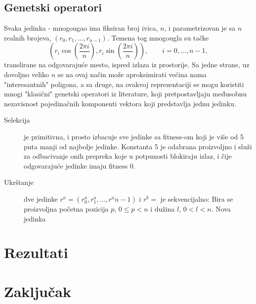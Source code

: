 \documentclass[12pt]{article}
\begin{document}
\subsection*{Genetski operatori}

Svaka jedinka - mnogougao ima fiksiran broj ivica, $n$, i parametrizovan je sa $n$ realnih brojeva, $(r_0, r_1, \dots, r_{n-1})$. Temena tog mnogougla su tačke
$$\left(r_i \cos\left(\frac{2\pi i}{n}\right), r_i \sin\left(\frac{2\pi i}{n}\right)\right), \qquad i=0,\dots,n-1,$$
translirane na odgovarajuće mesto, ispred izlaza iz prostorije. Sa jedne strane, uz dovoljno veliko $n$ se na ovaj način može aproksimirati većina nama "interesantnih" poligona, a sa druge, na ovakvoj reprezentaciji se mogu koristiti mnogi "klasični" genetski operatori iz literature, koji pretpostavljaju međusobnu nezavisnost pojedinačnih komponenti vektora koji predstavlja jednu jedinku.

\begin{description}
\item[Selekcija] je primitivna, i prosto izbacuje sve jedinke sa fitness-om koji je više od 5 puta manji od najbolje jedinke. Konstanta 5 je odabrana proizvoljno i služi za odbacivanje onih prepreka koje u potpunosti blokiraju izlaz, i čije odgovarajuće jedinke imaju fitness 0.
\item[Ukrštanje] dve jedinke $r^a = (r^a_0, r^a_1, \dots, r^a_{}n-1)$ i $r^b=$ je sekvencijalno: Bira se proizvoljna početna pozicija $p$, $0\leq p < n$ i dužina $l$, $0 < l < n $. Nova jedinka 
\end{description}

\subsection{}

\section{Rezultati}

\section{Zaključak}


  
\begin{scriptsize}

\end{scriptsize}
\end{document}
